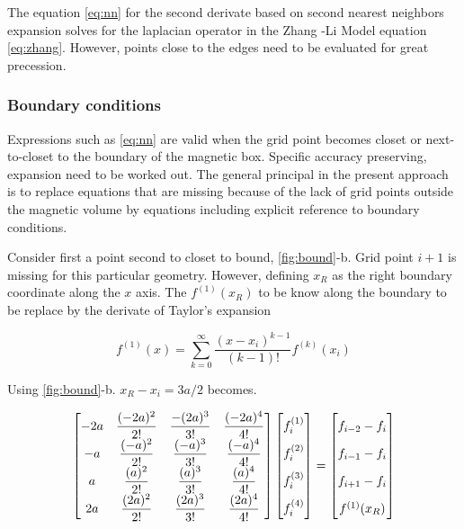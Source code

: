 The equation \ref{eq:nn} for the second derivate based on second nearest neighbors expansion solves for the laplacian operator in the Zhang -Li Model equation \ref{eq:zhang}. However, points close to the edges need to be evaluated for great precession. 

\subsubsection{Boundary conditions}

Expressions such as \ref{eq:nn} are valid when the grid point becomes closet or next-to-closet to the boundary of the magnetic box. Specific accuracy preserving, expansion need to be worked out. The general principal in the present approach is to replace equations that are missing because of the lack of grid points outside the magnetic volume by equations including explicit reference to boundary conditions. \cite{methods}

Consider first a point second to closet to bound, \ref{fig:bound}-b. Grid point $i + 1$ is missing for this particular geometry. However, defining $x_R$ as the right boundary coordinate along the $x$ axis. The $f^{(1)}(x_R)$ to be know along the boundary to be replace by the derivate of Taylor's expansion

\begin{equation} \label{eq:taylor}
f^{(1)}(x) = \sum\limits_{k=0}^{\infty} \dfrac{(x-x_i)^{k-1}}{(k - 1)!}f^{(k)}(x_i)
\end{equation}

Using \ref{fig:bound}-b. $x_R - x_i = 3a/2$ becomes.

\begin{align}
\begin{bmatrix} \label{eq:matrix4}
    -2a & \dfrac{(-2a)^2}{2!} & \dfrac{-(2a)^3}{3!} & \dfrac{(-2a)^4}{4!}\\
    -a & \dfrac{(-a)^2}{2!} & \dfrac{(-a)^3}{3!} & \dfrac{(-a)^4}{4!}\\
    a & \dfrac{(a)^2}{2!} & \dfrac{(a)^3}{3!} & \dfrac{(a)^4}{4!}\\
    2a & \dfrac{(2a)^2}{2!} & \dfrac{(2a)^3}{3!} & \dfrac{(2a)^4}{4!}
\end{bmatrix}
\begin{bmatrix}
    f_i^{(1)}  \vphantom{ \dfrac{d^4}{d} }\\
    f_i^{(2)}  \vphantom{ \dfrac{d^4}{d} } \\
    f_i^{(3)}  \vphantom{ \dfrac{d^4}{d} } \\
    f_i^{(4)}  \vphantom{ \dfrac{d^4}{d} }
\end{bmatrix}
=
\begin{bmatrix}
    f_{i-2} - f_{i}    \vphantom{ \dfrac{d^4}{d}} \\
    f_{i-1} - f_{i}    \vphantom{ \dfrac{d^4}{d}} \\
    f_{i+1} - f_{i}    \vphantom{ \dfrac{d^4}{d}} \\
    f^{(1)}(x_R)   \vphantom{ \dfrac{d^4}{d}}
\end{bmatrix}
\end{align}

